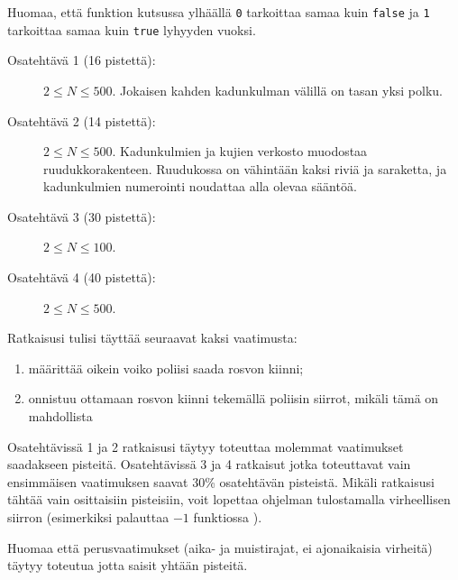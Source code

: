 \documentclass{boi2014-fi}
\newcommand{\constant}[1]{{\tt #1}}
\begin{document}
    Huomaa, että funktion  kutsussa ylhäällä
    \constant{0} tarkoittaa samaa kuin \constant{false} ja
    \constant{1} tarkoittaa samaa kuin \constant{true} lyhyyden vuoksi.

    \Scoring
    \begin{description}
        \item[Osatehtävä 1 (16 pistettä):] $2 \le N \le 500$.
        Jokaisen kahden kadunkulman välillä on tasan yksi polku.        
        \item[Osatehtävä 2 (14 pistettä):] $2 \le N \le 500$. Kadunkulmien ja
        kujien verkosto muodostaa ruudukkorakenteen. Ruudukossa on vähintään
        kaksi riviä ja saraketta, ja kadunkulmien numerointi noudattaa
        alla olevaa sääntöä.
        \begin{figure}[h!]
           \centering
        \end{figure}
        \item[Osatehtävä 3 (30 pistettä):] $2 \le N \le 100$.
        \item[Osatehtävä 4 (40 pistettä):] $2 \le N \le 500$.
    \end{description}

    Ratkaisusi tulisi täyttää seuraavat kaksi vaatimusta:
    \begin{enumerate}
        \item määrittää oikein voiko poliisi saada rosvon kiinni;
        \item onnistuu ottamaan rosvon kiinni tekemällä poliisin siirrot, mikäli tämä on mahdollista
    \end{enumerate}
    
    Osatehtävissä 1 ja 2 ratkaisusi täytyy toteuttaa molemmat vaatimukset
    saadakseen pisteitä.
    Osatehtävissä 3 ja 4 ratkaisut jotka toteuttavat vain ensimmäisen vaatimuksen
    saavat 30\% osatehtävän pisteistä. 
    Mikäli ratkaisusi tähtää vain osittaisiin pisteisiin, voit lopettaa
    ohjelman tulostamalla virheellisen siirron (esimerkiksi palauttaa $-1$
    funktiossa ).
    
    Huomaa että perusvaatimukset (aika- ja muistirajat, ei ajonaikaisia virheitä)
    täytyy toteutua jotta saisit yhtään pisteitä.
    
\end{document}
